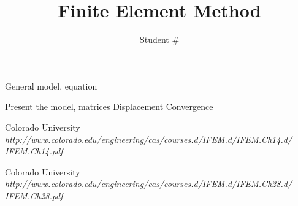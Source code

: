 \documentclass[9pt]{extarticle}
\title{Finite Element Method}
\author{Student \# }
\begin{document}
\maketitle



General model, equation




Present the model, matrices
Displacement
Convergence






















\begin{thebibliography}{2}

	Colorado University\\
	\emph{http://www.colorado.edu/engineering/cas/courses.d/IFEM.d/IFEM.Ch14.d/\\IFEM.Ch14.pdf}


	Colorado University\\
	\emph{http://www.colorado.edu/engineering/cas/courses.d/IFEM.d/IFEM.Ch28.d/\\IFEM.Ch28.pdf}	
\end{thebibliography}
\end{document}
